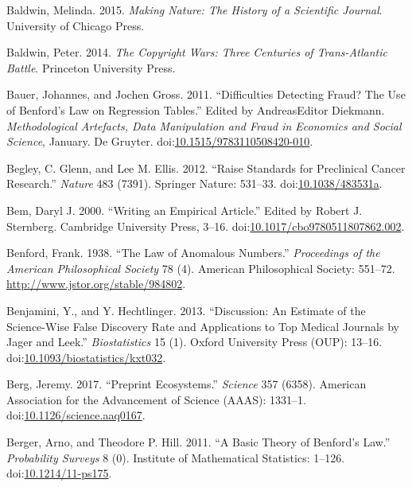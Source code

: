 \documentclass[a5paper]{book}
\begin{document}
\hypertarget{ref-isbn:9780226261454}{}
Baldwin, Melinda. 2015. \emph{Making Nature: The History of a Scientific
Journal}. University of Chicago Press.

\hypertarget{ref-isbn:9781400851911}{}
Baldwin, Peter. 2014. \emph{The Copyright Wars: Three Centuries of
Trans-Atlantic Battle}. Princeton University Press.

\hypertarget{ref-doi:10.1515ux2f9783110508420-010}{}
Bauer, Johannes, and Jochen Gross. 2011. ``Difficulties Detecting Fraud?
The Use of Benford's Law on Regression Tables.'' Edited by AndreasEditor
Diekmann. \emph{Methodological Artefacts, Data Manipulation and Fraud in
Economics and Social Science}, January. De Gruyter.
doi:\href{https://doi.org/10.1515/9783110508420-010}{10.1515/9783110508420-010}.

\hypertarget{ref-doi:10.1038ux2f483531a}{}
Begley, C. Glenn, and Lee M. Ellis. 2012. ``Raise Standards for
Preclinical Cancer Research.'' \emph{Nature} 483 (7391). Springer
Nature: 531--33.
doi:\href{https://doi.org/10.1038/483531a}{10.1038/483531a}.

\hypertarget{ref-doi:10.1017ux2fcbo9780511807862.002}{}
Bem, Daryl J. 2000. ``Writing an Empirical Article.'' Edited by Robert
J. Sternberg. Cambridge University Press, 3--16.
doi:\href{https://doi.org/10.1017/cbo9780511807862.002}{10.1017/cbo9780511807862.002}.

\hypertarget{ref-doi:10.2307ux2f984802}{}
Benford, Frank. 1938. ``The Law of Anomalous Numbers.''
\emph{Proceedings of the American Philosophical Society} 78 (4).
American Philosophical Society: 551--72.
\url{http://www.jstor.org/stable/984802}.

\hypertarget{ref-doi:10.1093ux2fbiostatisticsux2fkxt032}{}
Benjamini, Y., and Y. Hechtlinger. 2013. ``Discussion: An Estimate of
the Science-Wise False Discovery Rate and Applications to Top Medical
Journals by Jager and Leek.'' \emph{Biostatistics} 15 (1). Oxford
University Press (OUP): 13--16.
doi:\href{https://doi.org/10.1093/biostatistics/kxt032}{10.1093/biostatistics/kxt032}.

\hypertarget{ref-doi:10.1126ux2fscience.aaq0167}{}
Berg, Jeremy. 2017. ``Preprint Ecosystems.'' \emph{Science} 357 (6358).
American Association for the Advancement of Science (AAAS): 1331--1.
doi:\href{https://doi.org/10.1126/science.aaq0167}{10.1126/science.aaq0167}.

\hypertarget{ref-doi:10.1214ux2f11-ps175}{}
Berger, Arno, and Theodore P. Hill. 2011. ``A Basic Theory of Benford's
Law.'' \emph{Probability Surveys} 8 (0). Institute of Mathematical
Statistics: 1--126.
doi:\href{https://doi.org/10.1214/11-ps175}{10.1214/11-ps175}.
\end{document}
